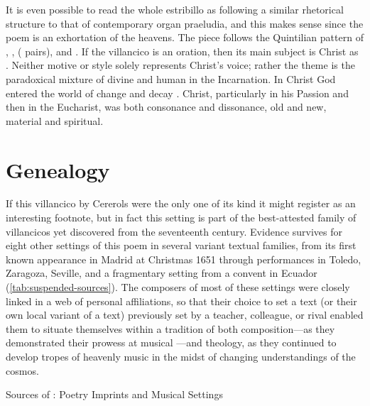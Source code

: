 It is even possible to read the whole estribillo as following a similar
rhetorical structure to that of contemporary organ praeludia, and this makes
sense since the poem is an exhortation of the heavens.%
The piece follows the Quintilian pattern of , ,
 ( pairs), and .
If the villancico is an oration, then its main subject is Christ as .
Neither motive or style solely represents Christ's voice; rather the theme is
the paradoxical mixture of divine and human in the Incarnation.
In Christ God entered the world of change and decay .
Christ, particularly in his Passion and then in the Eucharist, was both
consonance and dissonance, old and new, material and spiritual.


\section{Genealogy}

If this villancico by Cererols were the only one of its kind it might register
as an interesting footnote, but in fact this setting is part of the
best-attested family of villancicos yet discovered from the seventeenth century.
Evidence survives for eight other settings of this poem in several variant
textual families, from its first known appearance in Madrid at Christmas 1651
through performances in Toledo, Zaragoza, Seville, and a fragmentary setting
from a convent in Ecuador (\cref{tab:suspended-sources}).
The composers of most of these settings were closely linked in a web of personal
affiliations, so that their choice to set a text (or their own local variant of
a text) previously set by a teacher, colleague, or rival enabled them to situate
themselves within a tradition of both composition---as they demonstrated their
prowess at musical ---and theology, as they continued to
develop tropes of heavenly music in the midst of changing understandings of the
cosmos.

{Sources of : Poetry Imprints and
Musical Settings}

